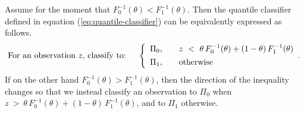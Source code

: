 \begin{lemma}
  \label{lem:decision-boundary}
  Assume for the moment that $F_{0}^{-1}(\theta) < F_{1}^{-1}(\theta)$.  Then
  the quantile classifier defined in equation (\ref{eq:quantile-classifier}) can
  be equivalently expressed as follows.
  \begin{equation}
    \label{eq:alt-quantile-classifier-less}
    \text{For an observation $z$, classify to:} \hspace{5mm} \left\{ 
      \begin{array}{lcl}
        \Pi_{0}, & & z ~<~ \theta\, F_{0}^{-1}(\theta) +
                       (1 - \theta)\, F_{1}^{-1}(\theta) \\[1ex]
        \Pi_{1}, & & \textup{otherwise}
      \end{array} .
    \right.
  \end{equation}
  If on the other hand $F_{0}^{-1}(\theta) > F_{1}^{-1}(\theta)$, then the
  direction of the inequality changes so that we instead classify an observation
  to $\Pi_0$ when
  $z ~>~ \theta\, F_{0}^{-1}(\theta) + (1 - \theta)\, F_{1}^{-1}(\theta)$, and
  to $\Pi_1$ otherwise.
\end{lemma}

